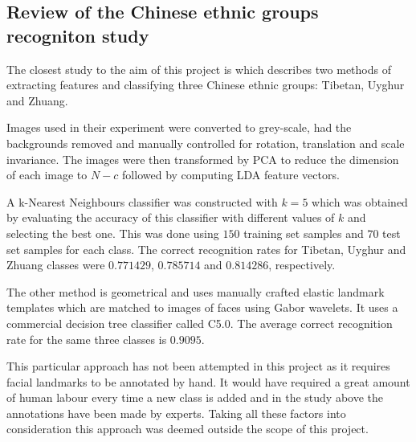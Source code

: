 \subsection{Review of the Chinese ethnic groups recogniton study}
The closest study to the aim of this project is \citep{chinesegroups} which
describes two methods of extracting features and classifying three Chinese
ethnic groups: Tibetan, Uyghur and Zhuang.

Images used in their experiment were converted to grey-scale, had the
backgrounds removed and manually controlled for rotation, translation and scale
invariance. The images were then transformed by PCA to reduce the dimension of
each image to $N-c$ followed by computing LDA feature vectors.

A k-Nearest Neighbours classifier was constructed with $k=5$ which was obtained
by evaluating the accuracy of this classifier with different values of $k$ and
selecting the best one. This was done using $150$ training set samples and $70$
test set samples for each class. The correct recognition rates for Tibetan,
Uyghur and Zhuang classes were $0.771429$, $0.785714$ and $0.814286$,
respectively.

The other method is geometrical and uses manually crafted elastic landmark
templates which are matched to images of faces using Gabor wavelets. It uses a
commercial decision tree classifier called C5.0. The average correct
recognition rate for the same three classes is $0.9095$.

This particular approach has not been attempted in this project as it requires
facial landmarks to be annotated by hand. It would have required a great amount
of human labour every time a new class is added and in the study above the
annotations have been made by experts. Taking all these factors into
consideration this approach was deemed outside the scope of this project.


